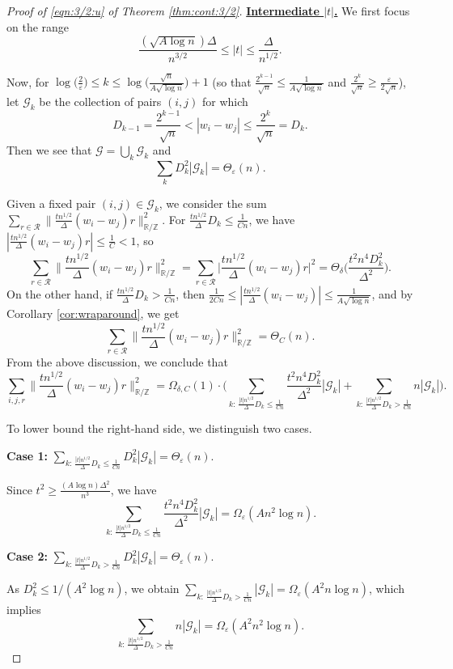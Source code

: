 \documentclass[10pt,a4paper]{amsart}
\newcommand\CG{{\mathcal G}}
\newcommand\CR{{\mathcal R}}
\newcommand\R{{\mathbb{R}}}
\newcommand\Z{{\mathbb{Z}}}
\newcommand\eps{{\varepsilon}}
\begin{document}
\begin{proof}[Proof of \eqref{eqn:3/2:u} of Theorem \ref{thm:cont:3/2}]
\underline{\bf Intermediate $|t|$.}  
We first focus on the range
\[
\frac{(\sqrt{A\log n})\Delta}{n^{3/2}} \le |t| \le \frac{\Delta}{n^{1/2}}.
\]

Now, for $\log \big(\frac{2}{\eps}\big)\le k \le \log\Big( \frac{\sqrt{n}}{A \sqrt{\log n}} \Big)+1$ (so that $\frac{2^{k-1}}{\sqrt{n}} \le \frac{1}{A\sqrt{\log n}}$ and $\frac{2^{k}}{\sqrt{n}} \ge \frac{\eps}{2\sqrt{n}}$), let $\CG_{k}$ be the collection of pairs $(i,j)$ for which
\[
D_{k-1} = \frac{2^{k-1}}{\sqrt{n}} < |w_{i}-w_{j}| \le \frac{2^{k}}{\sqrt{n}} = D_{k}.
\]
Then we see that $\CG=\bigcup_{k}\CG_{k}$ and
\[
\sum_{k} D_{k}^{2} |\CG_{k}| =\Theta_{\eps}(n).
\]

Given a fixed pair $(i,j)\in \CG_{k}$, we consider the sum $\sum_{r\in \CR} \|\frac{t n^{1/2}}{\Delta} (w_{i}-w_{j})r\|_{\R/\Z}^{2}$. For $\frac{t n^{1/2}}{\Delta}D_{k}\le \frac{1}{C n}$, we have $|\frac{t n^{1/2}}{\Delta} (w_{i}-w_{j})r|\le \frac{1}{C}<1$, so
\[
\sum_{r\in \CR}\Big\|\frac{t n^{1/2}}{\Delta} (w_{i}-w_{j})r\Big\|^{2}_{\R/\Z} = \sum_{r\in \CR}\Big|\frac{t n^{1/2}}{\Delta} (w_{i}-w_{j})r\Big|^2 =\Theta_{\delta} \Big(\frac{t^{2}n^{4}D^{2}_{k}}{\Delta^{2}}\Big).
\]
On the other hand, if $\frac{tn^{1/2}}{\Delta}D_{k}> \frac{1}{Cn}$, then $\frac{1}{2Cn}\le |\frac{tn^{1/2}}{\Delta}(w_{i}-w_{j})|\le \frac{1}{A\sqrt{\log n}}$, and by Corollary \ref{cor:wraparound}, we get
\[
\sum_{r\in \CR} \Big\|\frac{tn^{1/2}}{\Delta} (w_{i}-w_{j})r\Big\|_{\R/\Z}^{2} =\Theta_{C}(n).
\]
From the above discussion, we conclude that
\[
\sum_{i,j,r} \Big\|\frac{tn^{1/2}}{\Delta} (w_{i}-w_{j})r\Big\|_{\R/\Z}^{2}
=\Omega_{\delta,C}(1)\cdot
\Big(
\sum_{k: \, \frac{|t|n^{1/2}}{\Delta}D_{k} \le \frac{1}{Cn}} \frac{t^2 n^{4} D_{k}^{2}}{\Delta^2} |\CG_{k}|
+ \sum_{k: \, \frac{|t|n^{1/2}}{\Delta}D_{k}>\frac{1}{Cn}} n |\CG_{k}|\Big).
\]

To lower bound the right-hand side, we distinguish two cases.

\medskip
\noindent\textbf{Case 1:} $\sum_{k: \, \frac{|t|n^{1/2}}{\Delta}D_{k} \le \frac{1}{Cn}} D_{k}^{2} |\CG_{k}| =\Theta_{\eps}(n)$.

Since $t^2 \ge \frac{(A\log n)\Delta^{2}}{n^{3}}$, we have
\[
\sum_{k: \, \frac{|t|n^{1/2}}{\Delta}D_{k} \le \frac{1}{Cn}} \frac{t^2 n^{4} D_{k}^{2}}{\Delta^{2}} |\CG_{k}|
=\Omega_{\eps}(An^{2}\log n).
\]

\medskip
\noindent\textbf{Case 2:} $\sum_{k:\, \frac{|t|n^{1/2}}{\Delta}D_{k} > \frac{1}{Cn}} D_{k}^{2} |\CG_{k}| =\Theta_{\eps}(n)$.

As $D^{2}_{k}\le 1/(A^2\log n)$, we obtain $\sum_{k:\, \frac{|t|n^{1/2}}{\Delta}D_{k} > \frac{1}{Cn}} |\CG_{k}|= \Omega_{\eps}(A^2 n \log n)$,
which implies
\[
\sum_{k:\, \frac{|t|n^{1/2}}{\Delta}D_{k} > \frac{1}{Cn}} n |\CG_{k}|
=\Omega_{\eps}(A^2 n^{2}\log n).
\]


\end{proof}
\end{document}
